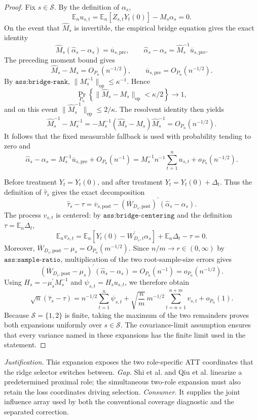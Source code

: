 \documentclass{article}
\begin{document}
\begin{proof}
Fix \(s\in\mathcal S\).  By the definition of \(\alpha_s\),
\[
 \mathbb E_n u_{s,t}
 =\mathbb E_n[Z_{s,t}Y_t(0)]-M_s\alpha_s=0.
\]
On the event that \(\widehat M_s\) is invertible, the empirical bridge equation gives the exact identity
\[
 \widehat M_s(\widehat\alpha_s-\alpha_s)
 =\overline u_{s,\mathrm{pre}},
 \qquad
 \widehat\alpha_s-\alpha_s
 =\widehat M_s^{-1}\overline u_{s,\mathrm{pre}}.
\]
The preceding moment bound gives
\[
 \widehat M_s-M_s=O_{P_n}(n^{-1/2}),
 \qquad
 \overline u_{s,\mathrm{pre}}=O_{P_n}(n^{-1/2}).
\]
By \(\texttt{ass:bridge-rank}\), \(\lVert M_s^{-1}\rVert_{\mathrm{op}}\leq\kappa^{-1}\).  Hence
\[
 \Pr_{P_n}\!\left\{\lVert\widehat M_s-M_s\rVert_{\mathrm{op}}<\kappa/2\right\}\longrightarrow1,
\]
and on this event \(\lVert\widehat M_s^{-1}\rVert_{\mathrm{op}}\leq2/\kappa\).  The resolvent identity then yields
\[
 \widehat M_s^{-1}-M_s^{-1}
 =-M_s^{-1}(\widehat M_s-M_s)\widehat M_s^{-1}
 =O_{P_n}(n^{-1/2}).
\]
It follows that the fixed measurable fallback is used with probability tending to zero and
\[
 \widehat\alpha_s-\alpha_s
 =M_s^{-1}\overline u_{s,\mathrm{pre}}+O_{P_n}(n^{-1})
 =M_s^{-1}n^{-1}\sum_{t=1}^n u_{s,t}+o_{P_n}(n^{-1/2}).
\]

Before treatment \(Y_t=Y_t(0)\), and after treatment \(Y_t=Y_t(0)+\Delta_t\).  Thus the definition of \(\widehat\tau_s\) gives the exact decomposition
\[
 \widehat\tau_s-\tau
 =\overline v_{s,\mathrm{post}}
  -(\overline W_{D_s,\mathrm{post}})^{\prime}
       (\widehat\alpha_s-\alpha_s).
\]
The process \(v_{s,t}\) is centered: by \(\texttt{ass:bridge-centering}\) and the definition \(\tau=\mathbb E_n\Delta_t\),
\[
 \mathbb E_n v_{s,t}
 =\mathbb E_n[Y_t(0)-W_{D_s,t}^{\prime}\alpha_s]
  +\mathbb E_n\Delta_t-\tau=0.
\]
Moreover, \(\overline W_{D_s,\mathrm{post}}-\mu_s=O_{P_n}(m^{-1/2})\).  Since \(n/m\to r\in(0,\infty)\) by \(\texttt{ass:sample-ratio}\), multiplication of the two root-sample-size errors gives
\[
 (\overline W_{D_s,\mathrm{post}}-\mu_s)^{\prime}
       (\widehat\alpha_s-\alpha_s)=O_{P_n}(n^{-1})=o_{P_n}(n^{-1/2}).
\]
Using \(H_s=-\mu_s^{\prime}M_s^{-1}\) and \(\psi_{s,t}=H_su_{s,t}\), we therefore obtain
\[
 \sqrt n(\widehat\tau_s-\tau)
 =n^{-1/2}\sum_{t=1}^n\psi_{s,t}
  +\sqrt{\frac nm}\,m^{-1/2}\sum_{t=n+1}^{n+m}v_{s,t}
  +o_{P_n}(1).
\]
Because \(\mathcal S=\{1,2\}\) is finite, taking the maximum of the two remainders proves both expansions uniformly over \(s\in\mathcal S\).  The covariance-limit assumption ensures that every variance named in these expansions has the finite limit used in the statement.
\end{proof}
\par\smallskip\noindent \textit{Justification.} This expansion exposes the two role-specific ATT coordinates that the ridge selector switches between. \textit{Gap.} Shi et al. and Qiu et al. linearize a predetermined proximal role; the simultaneous two-role expansion must also retain the loss coordinates driving selection. \textit{Consumer.} It supplies the joint influence array used by both the conventional coverage diagnostic and the separated correction.
\end{document}
